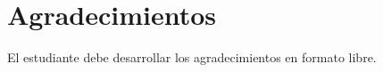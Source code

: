                       

 

\chapter*{Agradecimientos}

\bigskip

\bigskip

\bigskip

\bigskip

El estudiante debe desarrollar los agradecimientos en formato libre.
